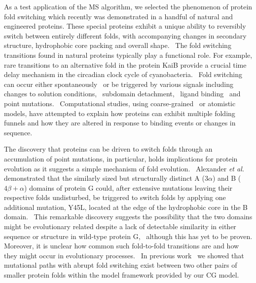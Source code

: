 \documentclass[
aip,
rsi,%
amsmath,amssymb,
reprint,%
]{revtex4-1}
\begin{document}
{\color{red} As a test application of the MS algorithm, we selected the phenomenon of protein fold switching which recently was demonstrated in a handful of natural and engineered proteins. These special proteins exhibit a unique ability to reversibly switch between entirely different folds, with accompanying changes in secondary structure, hydrophobic core packing and overall shape.~\cite{Bryan2010} The fold switching transitions found in natural proteins typically play a functional role. For example, rare transitions to an alternative fold in the protein KaiB provide a crucial time delay mechanism in the circadian clock cycle of cyanobacteria.~\cite{LiWang2015} Fold switching can occur either spontaneously~\cite{Meier2007} or be triggered by various signals including changes to solution conditions,~\cite{Kuloglu2002} subdomain detachment,~\cite{Burmann2012} ligand binding~\cite{Luo2004} and point mutations.~\cite{Alexander2009} Computational studies, using  coarse-grained~\cite{Holzgrafe2014,Holzgrafe2015,Kouza2012,Sutto2012} or atomistic~\cite{Ramirez-Sarmiento2015,Sikosek2016,Hansen2013} models, have attempted to explain how proteins can exhibit multiple folding funnels and how they are altered in response to binding events or changes in sequence.}

{\color{red} The discovery that proteins can be driven to switch folds through an accumulation of point mutations, in particular, holds implications for protein evolution as it suggests a simple mechanism of fold evolution.~\cite{Sikosek2014} Alexander \textit{et al.} demonstrated that the similarly sized but structurally distinct A ($3\alpha$) and B ($4\beta+\alpha$) domains of protein G could, after extensive mutations leaving their respective folds undisturbed, be triggered to switch folds by applying one additional mutation, Y45L, located at the edge of the hydrophobic core in the B domain.~\cite{Alexander2009} This remarkable discovery suggests the possibility that the two domains might be evolutionary related despite a lack of detectable similarity in either sequence or structure in wild-type protein G,~\cite{He2012} although this has yet to be proven. Moreover, it is unclear how common such fold-to-fold transitions are and how they might occur in evolutionary processes.~\cite{Porter2015} In previous work~\cite{Holzgrafe2014,Holzgrafe2015} we showed that mutational paths with abrupt fold switching exist between two other pairs of smaller protein folds within the model framework provided by our CG model.~\cite{Bhattacherjee2012} }
\end{document}
